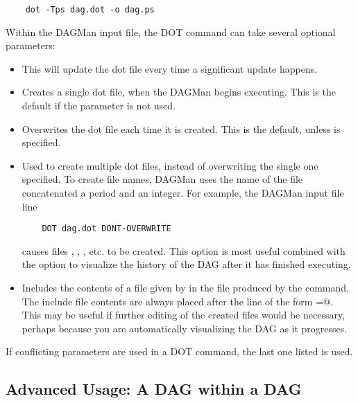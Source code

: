 \begin{verbatim}
    dot -Tps dag.dot -o dag.ps
\end{verbatim}

Within the DAGMan input file,
the DOT command can take several optional parameters:

\begin{itemize}

\item {}  This will update the dot file every time a
significant update happens. 

\item {} Creates a single dot file, when
the DAGMan begins executing. This is the default if the parameter
 is not used.

\item {} Overwrites the dot file each time it
is created. This is the default, unless 
is specified.

\item {} Used to create multiple dot files, instead
of overwriting the single one specified.
To create file names,
DAGMan uses the name of the file concatenated a period and an
integer. For example, the DAGMan input file line
\begin{verbatim}
	DOT dag.dot DONT-OVERWRITE
\end{verbatim}
causes files
,
,
,
etc. to be created.
This option is
most useful combined with the  option to
visualize the history of the DAG after it has finished executing. 

\item {} Includes the contents
of a file given by  in the file produced by the
 command.
The include file contents are always placed after the line of
the form
\verb@label=@.
This may be useful if further editing of the created files would
be necessary,
perhaps because you are automatically visualizing the DAG as it
progresses. 

\end{itemize}

If conflicting parameters are used in a DOT command, the last one
listed is used.
\subsection{\label{sec:DAGsinDAGs}Advanced Usage: A DAG within a DAG}

